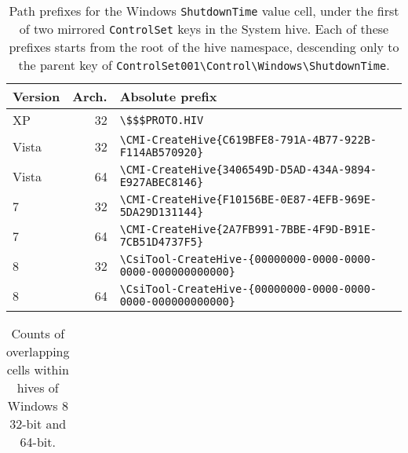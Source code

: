 \documentclass[11pt]{ucthesis}
\theoremstyle{plain}
\theoremstyle{definition}
\newcommand{\breakingbackslash}{\textbackslash\allowbreak{}}
\begin{document}
\begin{table}[htp]
\caption{Path prefixes for the Windows \texttt{ShutdownTime} value cell, under the first of two mirrored \texttt{ControlSet} keys in the System hive.  Each of these prefixes starts from the root of the hive namespace, descending only to the parent key of \texttt{ControlSet001{\breakingbackslash}Control{\breakingbackslash}Windows{\breakingbackslash}ShutdownTime}.}
\label{tbl:hivepathprefixes:shutdowntime}
\begin{center}
\begin{small}
\begin{tabular}{lrl}
\toprule
Version & Arch. & Absolute prefix \\
\midrule
XP & 32 & \texttt{{\breakingbackslash}\$\$\$PROTO.HIV} \\
\midrule
Vista & 32 & \texttt{{\breakingbackslash}CMI-CreateHive\{C619BFE8-791A-4B77-922B-F114AB570920\}} \\
Vista & 64 & \texttt{{\breakingbackslash}CMI-CreateHive\{3406549D-D5AD-434A-9894-E927ABEC8146\}} \\
\midrule
7 & 32 & \texttt{{\breakingbackslash}CMI-CreateHive\{F10156BE-0E87-4EFB-969E-5DA29D131144\}} \\
7 & 64 & \texttt{{\breakingbackslash}CMI-CreateHive\{2A7FB991-7BBE-4F9D-B91E-7CB51D4737F5\}} \\
\midrule
8 & 32 & \texttt{{\breakingbackslash}CsiTool-CreateHive-\{00000000-0000-0000-0000-000000000000\}} \\
8 & 64 & \texttt{{\breakingbackslash}CsiTool-CreateHive-\{00000000-0000-0000-0000-000000000000\}} \\
\bottomrule
\end{tabular}
\end{small}
\end{center}
\end{table}

\begin{table}[htp]
\caption{Counts of overlapping cells within hives of Windows 8 32-bit and 64-bit.}
\begin{center}
\begin{small}
\begin{tabular}{rl}
\toprule

\bottomrule
\end{tabular}
\end{small}
\end{center}
\label{tbl:win8hiveoverlap}
\end{table}
\end{document}
